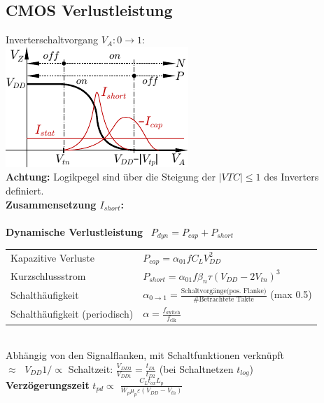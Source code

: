 \documentclass[6pt,a4paper]{scrartcl}
\renewcommand{\emph}[1]{\textsf{\textbf{#1}}}
\newcommand{\ra}[0]{\ensuremath{\rightarrow}} 									%
\begin{document}
\begin{multicols*}{3}
	\subsection{CMOS Verlustleistung}
	Inverterschaltvorgang $V_A: 0 \ra 1$:\\
	\includegraphics{./img/ds/char_inverter.pdf}\\
	\emph{Achtung:} Logikpegel sind über die Steigung der $|VTC|\le 1$ des Inverters definiert.\\
	\emph{Zusammensetzung $I_{short}$:}\\

	\\

	\emph{Dynamische Verlustleistung} \qquad \ $P_{dyn} = P_{cap} + P_{short}$\\
	\begin{tabular}{ll}
		\quad Kapazitive Verluste \qquad \ \quad \ & $P_{cap} = \alpha_{01} f C_L V_{DD}^2$\\
		\quad Kurzschlussstrom	& $P_{short} = \alpha_{01} f \beta_n \tau (V_{DD} - 2V_{tn})^3$\\[0.8em]
		\quad Schalthäufigkeit & $\alpha_{0 \rightarrow 1} = \frac{\text{Schaltvorgänge(pos. Flanke)}}{\text{\# Betrachtete Takte}}$ (max 0.5)\\
		\quad Schalthäufigkeit (periodisch) & $\alpha = \frac{f_\text{switch}}{f_\text{clk}}$\\
	\end{tabular}\\
	Abhängig von den Signalflanken, mit Schaltfunktionen verknüpft\\
	$\approx \;$ $V_{DD} 1/\propto $ Schaltzeit: $\frac{V_{DD2}}{V_{DD1}} = \frac{t_{D1}}{t_{D2}}$ (bei Schaltnetzen $t_{log}$)\\
	\textbf{Verzögerungszeit} $t_{pd}\propto$ $\frac{C_Lt_{ox}L_p}{W_p\mu_p\varepsilon(V_{DD} - V_{th})}$


\end{multicols*}
\end{document}

